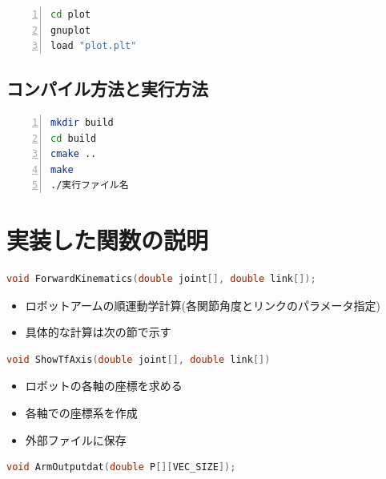 \documentclass[a4paper,10pt]{jsarticle}
\begin{document}
\begin{lstlisting}[basicstyle=\ttfamily\footnotesize, language=Bash, frame=single, firstnumber=1, numbers=left, breaklines=true]
cd plot
gnuplot
load "plot.plt"
\end{lstlisting}

\subsection{コンパイル方法と実行方法}

\begin{lstlisting}[basicstyle=\ttfamily\footnotesize, language=Bash, frame=single, firstnumber=1, numbers=left, breaklines=true]
mkdir build
cd build
cmake ..
make
./実行ファイル名
\end{lstlisting}

\section{実装した関数の説明}

\begin{lstlisting}[basicstyle=\ttfamily\footnotesize, language=C, frame=single, numbers=none, breaklines=true]
void ForwardKinematics(double joint[], double link[]);
\end{lstlisting}

\begin{itemize}
 \item ロボットアームの順運動学計算(各関節角度とリンクのパラメータ指定)
 \item 具体的な計算は次の節で示す
\end{itemize}

\begin{lstlisting}[basicstyle=\ttfamily\footnotesize, language=C, frame=single, numbers=none, breaklines=true]
void ShowTfAxis(double joint[], double link[])
\end{lstlisting}

\begin{itemize}
 \item ロボットの各軸の座標を求める
 \item 各軸での座標系を作成
 \item 外部ファイルに保存
\end{itemize}

\begin{lstlisting}[basicstyle=\ttfamily\footnotesize, language=C, frame=single, numbers=none, breaklines=true]
void ArmOutputdat(double P[][VEC_SIZE]);
\end{lstlisting}
\end{document}
